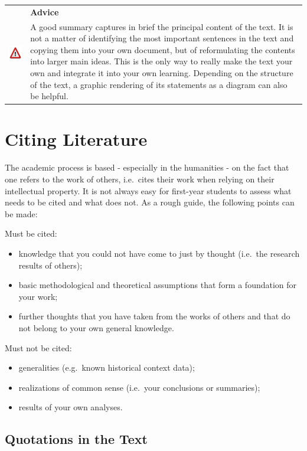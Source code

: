 \documentclass[
  english,
]{scrreprt}
\newlength{\iconwidth}
\newenvironment{displaybox}[2]{%
    \begin{center}
        \setlength\arrayrulewidth{0.75pt}%
        \arrayrulecolor{white}%
        \renewcommand{\arraystretch}{1.3}%
        \begin{tabular}{p{\iconwidth}p{\linewidth-4\tabcolsep-\iconwidth}}
            \multirow{2}{*}{#2}&\cellcolor{boxheadcol}\textbf{\sffamily\color{white}#1} \\%
            \hhline{~-}%
            &\cellcolor{boxcol}%
}{%
            \\
        \end{tabular}
        \arrayrulecolor{black}
    \end{center}
}
\newenvironment{Advice}{%
\begin{displaybox}{Advice}{\includegraphics[width=\iconwidth]{images/icon-hinweis}}}%
{\end{displaybox}}
\begin{document}
\begin{Advice}

A good summary captures in brief the principal content of the text. It is not a matter of identifying the most important sentences in the text and copying them into your own document, but of reformulating the contents into larger main ideas. This is the only way to really make the text your own and integrate it into your own learning. Depending on the structure of the text, a graphic rendering of its statements as a diagram can also be helpful.

\end{Advice}

\chapter{Citing Literature}\label{sec:citing}

The academic process is based - especially in the humanities - on the fact that one refers to the work of others, i.e.~cites their work when relying on their intellectual property. It is not always easy for first-year students to assess what needs to be cited and what does not. As a rough guide, the following points can be made:

Must be cited:

\begin{itemize}
\item
  knowledge that you could not have come to just by thought (i.e.~the research results of others);
\item
  basic methodological and theoretical assumptions that form a foundation for your work;
\item
  further thoughts that you have taken from the works of others and that do not belong to your own general knowledge.
\end{itemize}

Must not be cited:

\begin{itemize}
\item
  generalities (e.g.~known historical context data);
\item
  realizations of common sense (i.e.~your conclusions or summaries);
\item
  results of your own analyses.
\end{itemize}

\section{Quotations in the Text}\label{quotations-in-the-text}
\end{document}
